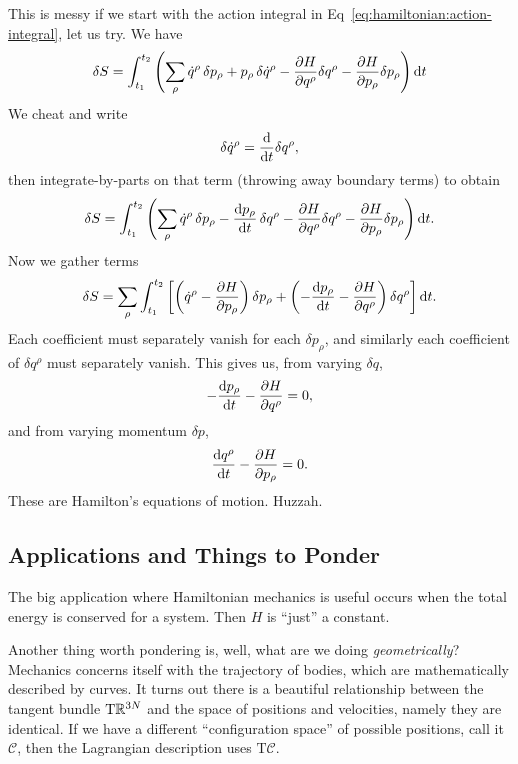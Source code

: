 This is messy if we start with the action integral in Eq~\eqref{eq:hamiltonian:action-integral},
let us try. We have
\begin{equation}
\delta S = \int^{t_{2}}_{t_{1}}\left(\sum_{\rho}\dot{q}^{\rho}\,\delta
p_{\rho}
+p_{\rho}\,\delta\dot{q}^{\rho}
-\frac{\partial H}{\partial q^{\rho}}\delta q^{\rho}
-\frac{\partial H}{\partial p_{\rho}}\delta p_{\rho}
\right)\mathrm{d} t
\end{equation}
We cheat and write
\begin{equation}
\delta\dot{q}^{\rho} = \frac{\mathrm{d}}{\mathrm{d} t}\delta q^{\rho},
\end{equation}
then integrate-by-parts on that term (throwing away boundary terms) to
obtain
\begin{equation}
\delta S = \int^{t_{2}}_{t_{1}}\left(\sum_{\rho}\dot{q}^{\rho}\,\delta
p_{\rho}
-\frac{\mathrm{d} p_{\rho}}{\mathrm{d} t}\,\delta q^{\rho}
-\frac{\partial H}{\partial q^{\rho}}\delta q^{\rho}
-\frac{\partial H}{\partial p_{\rho}}\delta p_{\rho}
\right)\mathrm{d} t.
\end{equation}
Now we gather terms
\begin{equation}
  \delta S = \sum_{\rho}\int^{t_{2}}_{t_{1}}\left[\left(\dot{q}^{\rho}
-\frac{\partial H}{\partial p_{\rho}}\right)\delta
p_{\rho}
+\left(-\frac{\mathrm{d} p_{\rho}}{\mathrm{d} t}-\frac{\partial H}{\partial q^{\rho}}\right)\delta q^{\rho}
\right]\mathrm{d} t.
\end{equation}
Each coefficient must separately vanish for each $\delta p_{\rho}$,
and similarly each coefficient of $\delta q^{\rho}$ must separately
vanish.
This gives us, from varying $\delta q$,
\begin{equation}
-\frac{\mathrm{d} p_{\rho}}{\mathrm{d} t}-\frac{\partial H}{\partial q^{\rho}} = 0,
\end{equation}
and from varying momentum $\delta p$,
\begin{equation}
\frac{\mathrm{d} q^{\rho}}{\mathrm{d} t} - \frac{\partial H}{\partial p_{\rho}} = 0.
\end{equation}
These are Hamilton's equations of motion. Huzzah.

\subsection{Applications and Things to Ponder}

\M
The big application where Hamiltonian mechanics is useful occurs when
the total energy is conserved for a system. Then $H$ is ``just'' a
constant.

Another thing worth pondering is, well, what are we doing
\emph{geometrically}? Mechanics concerns itself with the trajectory of
bodies, which are mathematically described by curves. It turns out there
is a beautiful relationship between the tangent bundle $\mathrm{T}\mathbb{R}^{3N}$
and the space of positions and velocities, namely they are identical.
If we have a different ``configuration space'' of possible positions,
call it $\mathcal{C}$, then the Lagrangian description uses
$\mathrm{T}\mathcal{C}$. 

